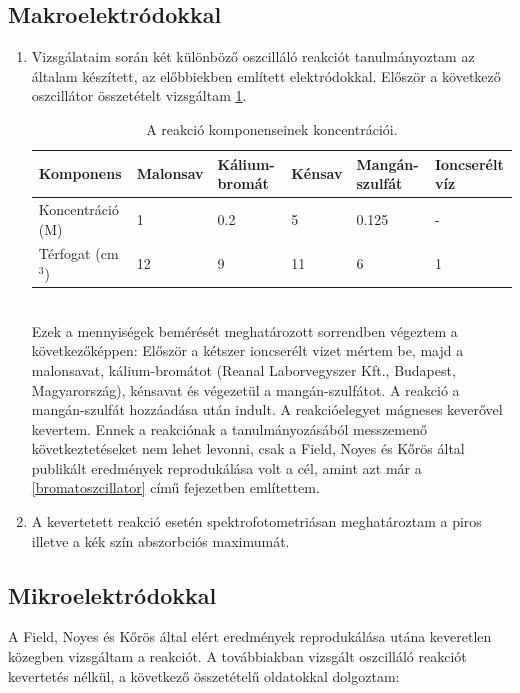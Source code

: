 \subsection{Makroelektródokkal}
\begin{enumerate}
\item Vizsgálataim során két különböző oszcilláló reakciót tanulmányoztam az általam készített, az előbbiekben említett elektródokkal. 
Először a következő oszcillátor összetételt vizsgáltam \ref{my-label}.
\begin{table}[h!]
\centering
\caption{A reakció komponenseinek koncentrációi.}
\label{my-label}
\begin{tabular}{llllll}
Komponens                       & Malonsav & Kálium-bromát & Kénsav & Mangán-szulfát & Ioncserélt víz \\
\hline
Koncentráció (M)                & 1        & 0.2           & 5      & 0.125          & -              \\
Térfogat (cm$^3$) & 12       & 9             & 11     & 6              & 1              \\
\end{tabular}
\end{table}\\
Ezek a mennyiségek bemérését meghatározott sorrendben végeztem a következőképpen: Először a kétszer ioncserélt vizet mértem be, majd a malonsavat, kálium-bromátot (Reanal Laborvegyszer Kft., Budapest, Magyarország), kénsavat és végezetül a mangán-szulfátot. A reakció a mangán-szulfát hozzáadása után indult. A reakcióelegyet mágneses keverővel kevertem. Ennek a reakciónak a tanulmányozásából messzemenő következtetéseket nem lehet levonni, csak a Field, Noyes és Kőrös által publikált eredmények reprodukálása \cite{noyes1972oscillations} volt a cél, amint azt már a \ref{bromatoszcillator} című fejezetben említettem.
\item A kevertetett reakció esetén spektrofotometriásan meghatároztam a piros illetve a kék szín abszorbciós maximumát.
\end{enumerate}

\subsection{Mikroelektródokkal} \label{mikroelektrod}

A Field, Noyes és Kőrös által elért eredmények reprodukálása utána \cite{noyes1972oscillations} keveretlen közegben vizsgáltam a reakciót.
A továbbiakban vizsgált oszcilláló reakciót kevertetés nélkül, a következő összetételű oldatokkal dolgoztam: 

